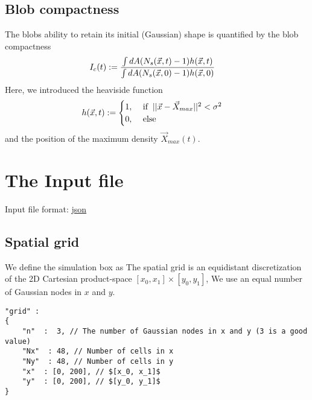 \subsection{Blob compactness}
The blobs ability to retain its initial (Gaussian) shape is quantified by the  blob compactness
\begin{align}
     I_c(t) &:= \frac{\int dA ({N_s} (\vec{x},t)-1) h(\vec{x},t)}{\int dA
({N_s} (\vec{x},0)-1) h(\vec{x},0)}
\end{align}
Here, we introduced the heaviside function
\begin{align}
     h(\vec{x},t) &:= \begin{cases}
          1,
        &\ \text{if} \hspace{2mm}||\vec{x} - \vec{X}_{max}||^2 < \sigma^2 \\
0,  &\ \text{else}
           \end{cases} \nonumber
\end{align}
and the position of the maximum density \( \vec{X}_{max}(t)\).


\section{The Input file} \label{sec:input_file}
Input file format: \href{https://en.wikipedia.org/wiki/JSON}{json}
\subsection{Spatial grid} \label{sec:spatial}
We define the simulation box as
The spatial grid is an equidistant discretization of the 2D Cartesian
product-space
$[ x_0, x_1]\times [y_0, y_1]$,
We use an equal number of Gaussian nodes in $x$ and $y$.
\begin{verbatim}
"grid" :
{
    "n"  :  3, // The number of Gaussian nodes in x and y (3 is a good value)
    "Nx"  : 48, // Number of cells in x
    "Ny"  : 48, // Number of cells in y
    "x"  : [0, 200], // $[x_0, x_1]$
    "y"  : [0, 200], // $[y_0, y_1]$
}
\end{verbatim}
